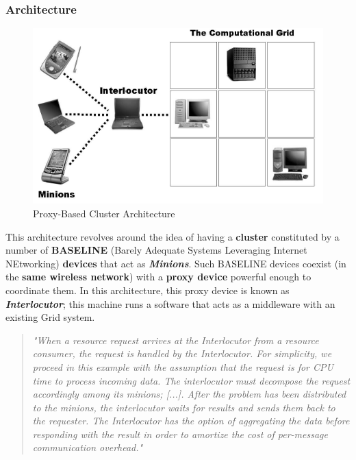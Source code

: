 \subsubsection{Architecture}
\begin{figure}[H]
    \centering
    \includegraphics[scale=0.85]{document/chapters/chapter_3/images/2002_architecture.png}
    \caption{Proxy-Based Cluster Architecture \cite{integrating_mobile_devices_into_grid}}
    \label{fig:2002_architecture}
\end{figure}
This architecture revolves around the idea of having a \textbf{cluster} constituted by a number of \textbf{BASELINE} (Barely Adequate Systems Leveraging Internet NEtworking) \textbf{devices} that act as \textbf{\textit{Minions}}. Such BASELINE devices coexist (in the \textbf{same wireless network}) with a \textbf{proxy device} powerful enough to coordinate them. In this architecture, this proxy device is known as \textbf{\textit{Interlocutor}}; this machine runs a software that acts as a middleware with an existing Grid system.
\begin{quotation}
    \textit{"When a resource request arrives at the Interlocutor from a resource consumer, the request is handled by the Interlocutor. For simplicity, we proceed in this example with the assumption that the request is for CPU time to process incoming data. The interlocutor must decompose the request accordingly among its minions; [...]. After the problem has been distributed to the minions, the interlocutor waits for results and sends them back to the requester. The Interlocutor has the option of aggregating the data before responding with the result in order to amortize the cost of per-message communication overhead." \cite{integrating_mobile_devices_into_grid}}
\end{quotation}

